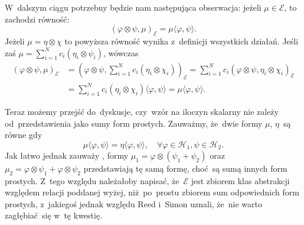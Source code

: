 \documentclass[a4paper,11pt]{article}
\newcommand{\mc}{\mathcal}
\newcommand{\vp}{\varphi}
\newcommand{\Hc}{\mc{H}}
\newcommand{\ot}{\otimes}
\newcommand{\Sum}{\sum\limits}
\newcommand{\lket}{\langle}
\newcommand{\rket}{\rangle}
\begin{document}
W~dalszym ciągu potrzebny %
będzie nam następująca obserwacja: jeżeli $\mu \in \mc{E}$, to
zachodzi równość:
\begin{displaymath}
  ( \vp \ot \psi, \mu )_{ \mc{E} } = \mu\lket \vp, \psi \rket.
\end{displaymath}
Jeżeli $\mu = \eta \ot \chi$ to powyższa równość wynika z~definicji
wszystkich działań. Jeśli zaś
$\mu = \Sum_{ i = 1 }^{ N } c_{ i } ( \eta_{ i } \ot \psi_{ i } )$,
wówczas
\begin{displaymath}
  \begin{split}
    ( \vp \ot \psi, \mu )_{ \mc{E} } &= \left( \vp \ot \psi, \Sum_{ i
        = 1 }^{ N } c_{ i } ( \eta_{ i } \ot \chi_{ i } ) \right)_{
      \mc{E} } = \Sum_{ i = 1 }^{ N } c_{ i } ( \vp \ot \psi,
    \eta_{ i } \ot \chi_{ i } )_{ \mc{E} } \\
    &= \Sum_{ i = 1 }^{ N } c_{ i } ( \eta_{ i } \ot \chi_{ i } )
    \lket \vp, \psi \rket = \mu\lket \vp, \psi \rket.
  \end{split}
\end{displaymath}

Teraz możemy przejść do~dyskusje, %
czy~wzór na iloczyn skalarny nie zależy od~przedstawienia jako sumy
form prostych. Zauważmy, że~dwie formy $\mu$, $\eta$~są równe gdy
\begin{displaymath}
  \mu\lket \vp, \psi \rket = \eta\lket \vp, \psi \rket,
  \quad \forall \vp \in \Hc_{ 1 }, \psi \in \Hc_{ 2 }.
\end{displaymath}
Jak łatwo jednak zauważy %
, formy $\mu_{ 1 } = \vp \ot ( \psi_{ 1 } + \psi_{ 2 } )$
oraz~$\mu_{ 2 } = \vp \ot \psi_{ 1 } + \vp \ot \psi_{ 2 }$
przedstawiają tę samą formę, choć~są sumą innych form prostych. Z~tego
względu należałoby napisać, że~$\mc{E}$ jest zbiorem klas abstrakcji
względem relacji poddanej wyżej, niż~po~prostu zbiorem sum
odpowiednich form prostych, z~jakiegoś jednak względu Reed i~Simon
uznali, że~nie warto zagłębiać~się w~tę kwestię.
\end{document}
